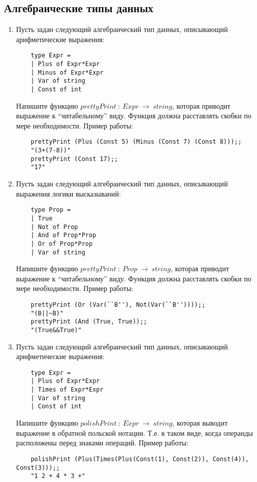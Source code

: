 \documentclass[a4paper,11pt]{article}
\begin{document}
\subsection*{Алгебраические типы данных}
\begin{enumerate}
\item Пусть задан следующий алгебраический тип данных, описывающий
  арифметические выражения:
  \begin{lstlisting}
    type Expr = 
    | Plus of Expr*Expr
    | Minus of Expr*Expr
    | Var of string
    | Const of int
  \end{lstlisting}
  Напишите функцию $prettyPrint~:~Expr~\rightarrow~string$, которая приводит 
  выражение к ``читабельному'' виду. Функция должна расставлять скобки по мере
  необходимости. Пример работы:
  \begin{lstlisting}
    prettyPrint (Plus (Const 5) (Minus (Const 7) (Const 8)));;
    "(3+(7-8))"
    prettyPrint (Const 17);;
    "17"
  \end{lstlisting}

\item Пусть задан следующий алгебраический тип данных, описывающий выражения 
  логики высказываний:
  \begin{lstlisting}
    type Prop =
    | True
    | Not of Prop
    | And of Prop*Prop
    | Or of Prop*Prop
    | Var of string
  \end{lstlisting}
  Напишите функцию $prettyPrint~:~Prop~\rightarrow~string$, которая приводит 
  выражение к ``читабельному'' виду. Функция должна расставлять скобки по мере
  необходимости. Пример работы:
  \begin{lstlisting}
    prettyPrint (Or (Var(``B''), Not(Var(``B''))));;
    "(B||~B)"
    prettyPrint (And (True, True));;
    "(True&&True)"
  \end{lstlisting}

\item Пусть задан следующий алгебраический тип данных, описывающий
  арифметические выражения:
  \begin{lstlisting}
    type Expr = 
    | Plus of Expr*Expr
    | Times of Expr*Expr
    | Var of string
    | Const of int
  \end{lstlisting}
  Напишите функцию $polishPrint~:~Expr~\rightarrow~string$, которая выводит
  выражение в обратной польской нотации. Т.е. в таком виде, когда операнды
  расположены перед знаками операций. Пример работы:
  \begin{lstlisting}
    polishPrint (Plus(Times(Plus(Const(1), Const(2)), Const(4)), Const(3)));;
    "1 2 + 4 * 3 +"
  \end{lstlisting}
\end{enumerate}
\end{document}
